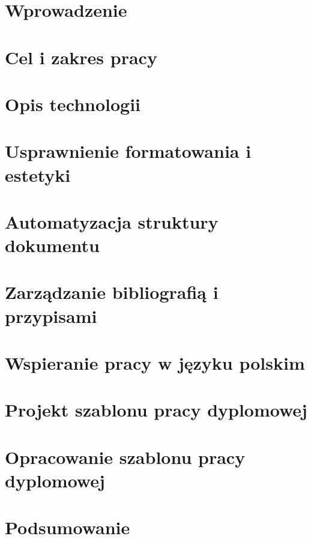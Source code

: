 
\chapter{Wprowadzenie}


\chapter{Cel i zakres pracy}


\chapter{Opis technologii}


\chapter{Usprawnienie formatowania i estetyki}


\chapter{Automatyzacja struktury dokumentu}


\chapter{Zarządzanie bibliografią i przypisami}


\chapter{Wspieranie pracy w języku polskim}


\chapter{Projekt szablonu pracy dyplomowej}


\chapter{Opracowanie szablonu pracy dyplomowej}


\chapter{Podsumowanie}
